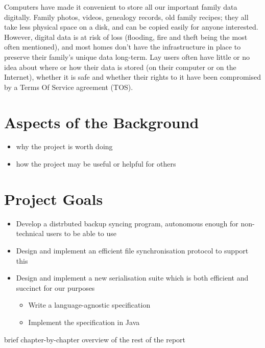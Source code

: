 \documentclass[12pt,a4paper,]{adreport}
\begin{document}
Computers have made it convenient to store all our important family data
digitally. Family photos, videos, genealogy records, old family recipes;
they all take less physical space on a disk, and can be copied easily
for anyone interested. However, digital data is at risk of loss
(flooding, fire and theft being the most often mentioned), and most
homes don't have the infrastructure in place to preserve their family's
unique data long-term. Lay users often have little or no idea about
where or how their data is stored (on their computer or on the
Internet), whether it is safe and whether their rights to it have been
compromised by a Terms Of Service agreement (TOS).

\section{Aspects of the Background}\label{aspects-of-the-background}

\begin{itemize}
\itemsep1pt\parskip0pt
\item
  why the project is worth doing
\item
  how the project may be useful or helpful for others
\end{itemize}

\section{Project Goals}\label{project-goals}

\begin{itemize}
\itemsep1pt\parskip0pt
\item
  Develop a distrbuted backup syncing program, autonomous enough for
  non-technical users to be able to use
\item
  Design and implement an efficient file synchronisation protocol to
  support this
\item
  Design and implement a new serialisation suite which is both efficient
  and succinct for our purposes

  \begin{itemize}
  \itemsep1pt\parskip0pt
  \item
    Write a language-agnostic specification
  \item
    Implement the specification in Java
  \end{itemize}
\end{itemize}

brief chapter-by-chapter overview of the rest of the report
\end{document}
